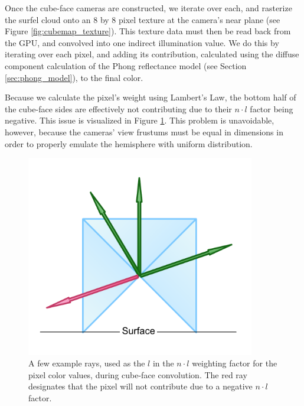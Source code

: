 Once the cube-face cameras are constructed, we iterate over each, and rasterize the surfel cloud onto an 8 by 8 pixel texture at the camera's near plane (see Figure \ref{fig:cubemap_texture}). This texture data must then be read back from the GPU, and convolved into one indirect illumination value. We do this by iterating over each pixel, and adding its contribution, calculated using the diffuse component calculation of the Phong reflectance model (see Section \ref{sec:phong_model}), to the final color.

Because we calculate the pixel's weight using Lambert's Law, the bottom half of the cube-face sides are effectively not contributing due to their $n \cdot l$ factor being negative. This issue is visualized in Figure \ref{fig:cubemap_rays}. This problem is unavoidable, however, because the cameras' view frustums must be equal in dimensions in order to properly emulate the hemisphere with uniform distribution.

\begin{figure}[h!]
   \centering
   \includegraphics[width=100mm]{../img/cubemap_rays.png}
   \captionfonts
   \caption[Cubemap pixel-rays]{A few example rays, used as the $l$ in the $n \cdot l$ weighting factor for the pixel color values, during cube-face convolution. The red ray designates that the pixel will not contribute due to a negative $n \cdot l$ factor.}
   \label{fig:cubemap_rays}
\end{figure}

